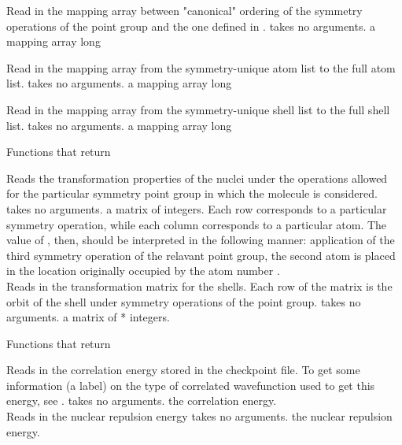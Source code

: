 \noindent {}
{Read in the mapping array between "canonical" ordering
of the symmetry operations of the point group and the
one defined in .}
{takes no arguments.}
{a mapping array  long}

\noindent {}
{Read in the mapping array from the symmetry-unique atom 
list to the full atom list.}
{takes no arguments.}
{a mapping array  long}

\noindent {}
{Read in the mapping array from the symmetry-unique shell list
to the full shell list.}
{takes no arguments.}
{a mapping array  long}

\begin{center}
Functions that return 
\end{center}
{Reads the transformation properties of the nuclei
under the operations allowed for the particular symmetry point group
in which the molecule is considered.}
{takes no arguments.}
{a matrix of integers. Each row corresponds
to a particular symmetry operation, while each column corresponds to
a particular atom.  The value of , then, should be interpreted
in the following manner: application of the third symmetry operation of 
the relavant point group, the second atom is placed in the location
originally occupied by the atom number .} \\

\noindent {}
{Reads in the transformation matrix for the shells. Each row of the 
matrix is the orbit of the shell under symmetry operations of the point 
group.}
{takes no arguments.}
{a matrix of * integers.}

\begin{center}
Functions that return 
\end{center}
{Reads in the correlation energy stored in the checkpoint file. To get some
information (a label) on the type of correlated wavefunction
used to get this energy, see .}
{takes no arguments.}
{the correlation energy.} \\

\noindent {}
{Reads in the nuclear repulsion energy}
{takes no arguments.}
{the nuclear repulsion energy.} \\


